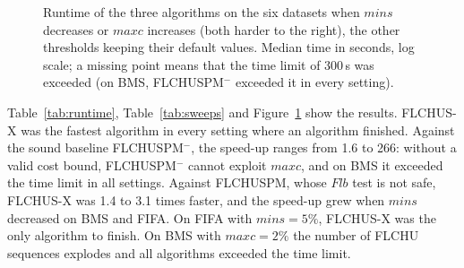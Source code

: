 \documentclass[pdflatex,sn-mathphys,Numbered]{sn-jnl}
\theoremstyle{thmstyleone}
\theoremstyle{thmstyletwo}
\theoremstyle{thmstylethree}
\newcommand{\FL}{\textsc{FLCHUSPM}}
\newcommand{\FX}{\textsc{FLCHUS-X}}
\newcommand{\flb}{\ensuremath{\mathit{Flb}}}
\newcommand{\minu}{\ensuremath{\mathit{minu}}}
\newcommand{\maxc}{\ensuremath{\mathit{maxc}}}
\newcommand{\mins}{\ensuremath{\mathit{mins}}}
\begin{document}
\begin{table}[t]
\centering
\caption{Median runtime (s) at the default setting (\mins\%, \minu\%, \maxc\%) of each dataset.
Gain: speed-up of \FX{} over \FL$^{-}$; TL: time limit of 300\,s exceeded.}
\label{tab:runtime}
{\footnotesize{}}
\end{table}

\begin{table}[t]
\centering
\caption{Range of the speed-up of \FX{} over \FL{} and over \FL$^{-}$ across the settings of each
sweep. Solved: number of settings solved within the time limit by \FL{} / \FL$^{-}$ / \FX{}.}
\label{tab:sweeps}
{\footnotesize{}}
\end{table}

\begin{figure}[t]
\centering
{}

\vspace{1mm}
\caption{Runtime of the three algorithms on the six datasets when \mins{} decreases or \maxc{}
increases (both harder to the right), the other thresholds keeping their default values. Median
time in seconds, log scale; a missing point means that the time limit of 300\,s was exceeded
(on BMS, \FL$^{-}$ exceeded it in every setting).}
\label{fig:runtime}
\end{figure}

Table~\ref{tab:runtime}, Table~\ref{tab:sweeps} and Figure~\ref{fig:runtime} show the results.
\FX{} was the fastest algorithm in every setting where an algorithm finished. Against the
sound baseline \FL$^{-}$, the speed-up ranges from 1.6 to 266: without a valid cost bound,
\FL$^{-}$ cannot exploit \maxc{}, and on BMS it exceeded the time limit in all settings. Against
\FL{}, whose \flb{} test is not safe, \FX{} was 1.4 to 3.1 times faster, and the speed-up grew
when \mins{} decreased on BMS and FIFA. On FIFA with $\mins = 5\%$, \FX{} was the only algorithm
to finish. On BMS with $\maxc = 2\%$ the number of FLCHU sequences explodes and all algorithms
exceeded the time limit.
\end{document}
